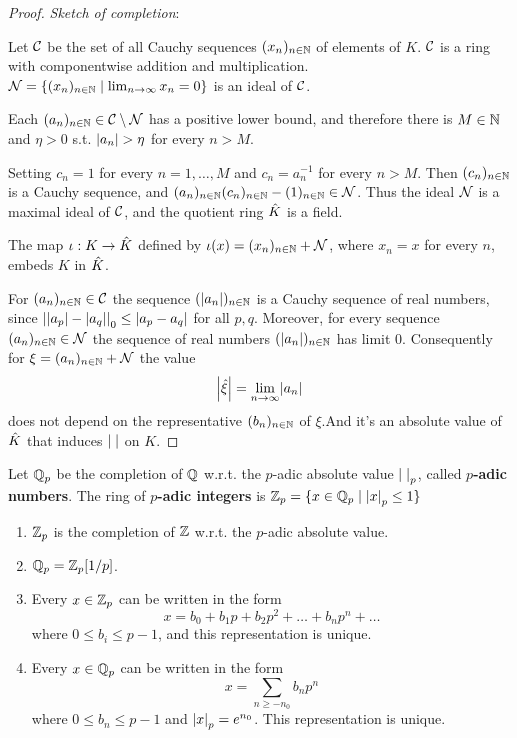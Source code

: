 \documentclass[11pt]{article}
\begin{document}
\begin{proof}
\emph{Sketch of completion}:

Let \(\mathcal{C}\) be the set of all Cauchy sequences \((x_n)_{n\in\mathbb{N}}\) of elements of \(K\). \(\mathcal{C}\) is a
ring with componentwise addition and multiplication. \(\mathcal{N}=\{(x_n)_{n\in\mathbb{N}}\mid\lim_{n\to\infty}x_n=0\}\) is
an ideal of \(\mathcal{C}\).

Each \((a_n)_{n\in\mathbb{N}}\in\mathcal{C}\setminus\mathcal{N}\) has a positive lower bound, and therefore there is \(M\in\mathbb{N}\) and \(\eta>0\)
s.t. \(\abs{a_n}>\eta\) for every \(n>M\).

Setting \(c_n=1\) for every \(n=1,\dots,M\) and \(c_n=a_n^{-1}\) for every \(n>M\).
Then \((c_n)_{n\in\mathbb{N}}\) is a Cauchy sequence, and \((a_n)_{n\in\mathbb{N}}(c_n)_{n\in\mathbb{N}}-(1)_{n\in\mathbb{N}}\in\mathcal{N}\). Thus the
ideal \(\mathcal{N}\) is a maximal ideal of \(\mathcal{C}\), and the quotient ring \(\hat{K}\) is a field.

The map \(\iota:K\to\hat{K}\) defined by \(\iota(x)=(x_n)_{n\in\mathbb{N}}+\mathcal{N}\), where \(x_n=x\) for every \(n\),
embeds \(K\) in \(\hat{K}\).

For \((a_n)_{n\in\mathbb{N}}\in\mathcal{C}\) the sequence \((\abs{a_n})_{n\in\N}\) is a Cauchy sequence of real numbers,
since \(\abs{\abs{a_p}-\abs{a_q}}_0\le\abs{a_p-a_q}\) for all \(p,q\). Moreover, for every
sequence \((a_n)_{n\in\mathbb{N}}\in\mathcal{N}\) the sequence of real numbers \((\abs{a_n})_{n\in\N}\) has limit 0.
Consequently for \(\xi=(a_n)_{n\in\mathbb{N}}+\mathcal{N}\) the value
\begin{equation*}
\abs{\hat{\xi}}=\lim_{n\to\infty}\abs{a_n}
\end{equation*}
does not depend on the representative \((b_n)_{n\in\mathbb{N}}\) of \(\xi\).And it's an absolute value
of \(\hat{K}\) that induces \(\abs{\;}\) on \(K\).
\end{proof}

\begin{definition}[]
Let \(\mathbb{Q}_p\) be the completion of \(\mathbb{Q}\) w.r.t. the \(p\)-adic absolute value \(\abs{\;}_p\),
called \textbf{\(p\)-adic numbers}. The ring of \textbf{\(p\)-adic integers} is \(\Z_p=\{x\in\Q_p\mid\abs{x}_p\le 1\}\)
\end{definition}

\begin{fact}[]
\begin{enumerate}
\item \(\mathbb{Z}_p\) is the completion of \(\mathbb{Z}\) w.r.t. the \(p\)-adic absolute value.
\item \(\mathbb{Q}_p=\mathbb{Z}_p[1/p]\).
\item Every \(x\in\mathbb{Z}_p\) can be written in the form
\begin{equation*}
x=b_0+b_1p+b_2p^2+\dots+b_np^n+\dots
\end{equation*}
where \(0\le b_i\le p-1\), and this representation is unique.
\item Every \(x\in\mathbb{Q}_p\) can be written in the form
\begin{equation*}
x=\sum_{n\ge-n_0}b_np^n
\end{equation*}
where \(0\le b_n\le p-1\) and \(\abs{x}_p=e^{n_0}\). This representation is unique.
\end{enumerate}
\end{fact}
\end{document}
